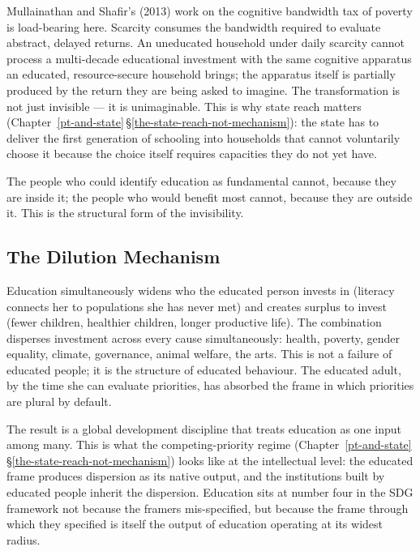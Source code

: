 \documentclass[12pt,letterpaper]{article}
\begin{document}
Mullainathan and Shafir's (2013) work on the cognitive bandwidth tax
of poverty is load-bearing here. Scarcity consumes the bandwidth
required to evaluate abstract, delayed returns. An uneducated
household under daily scarcity cannot process a multi-decade
educational investment with the same cognitive apparatus an educated,
resource-secure household brings; the apparatus itself is partially
produced by the return they are being asked to imagine. The
transformation is not just invisible --- it is unimaginable. This is
why state reach matters
(Chapter~\ref{pt-and-state}\,\S\ref{the-state-reach-not-mechanism}):
the state has to deliver the first generation of schooling into
households that cannot voluntarily choose it because the choice
itself requires capacities they do not yet have.

The people who could identify education as fundamental cannot,
because they are inside it; the people who would benefit most cannot,
because they are outside it. This is the structural form of the
invisibility.

\subsection{The Dilution Mechanism}\label{the-dilution-mechanism}

Education simultaneously widens who the educated person invests in
(literacy connects her to populations she has never met) and creates
surplus to invest (fewer children, healthier children, longer
productive life). The combination disperses investment across every
cause simultaneously: health, poverty, gender equality, climate,
governance, animal welfare, the arts. This is not a failure of
educated people; it is the structure of educated behaviour. The
educated adult, by the time she can evaluate priorities, has absorbed
the frame in which priorities are plural by default.

The result is a global development discipline that treats education
as one input among many. This is what the competing-priority regime
(Chapter~\ref{pt-and-state}\,\S\ref{the-state-reach-not-mechanism})
looks like at the intellectual level: the educated frame produces
dispersion as its native output, and the institutions built by
educated people inherit the dispersion. Education sits at number
four in the SDG framework not because the framers mis-specified, but
because the frame through which they specified is itself the output
of education operating at its widest radius.
\end{document}
